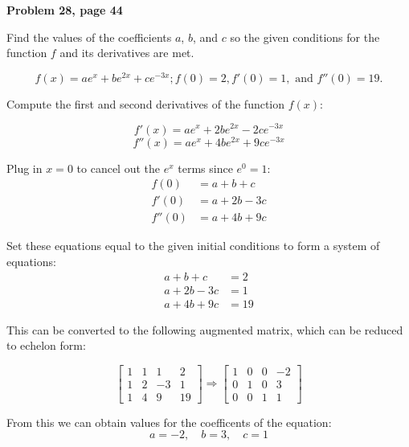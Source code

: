 \documentclass[12pt]{article}
\begin{document}
\pagebreak
\textbf{Problem 28, page 44}

Find the values of the coefficients $a$, $b$, and $c$ so the given conditions for the function $f$ and its derivatives are met.

$$f(x) = ae^{x} + be^{2x} + ce^{-3x}; f(0) = 2, f'(0) = 1,\text{ and } f''(0) = 19.$$


\begin{solution}

Compute the first and second derivatives of the function $f(x)$:

$$ f'(x) = ae^{x} + 2be^{2x} - 2ce^{-3x}$$
$$  f''(x) = ae^{x} + 4be^{2x} + 9ce^{-3x} $$

Plug in $x = 0$ to cancel out the $e^{x}$ terms since $e^{0} = 1$:
\begin{align*}
f(0) &= a + b + c \\ 
f'(0) &= a + 2b - 3c \\
f''(0) &= a + 4b + 9c 
\end{align*}

Set these equations equal to the given initial conditions to form a system of equations:
\begin{align*}
a + b + c &= 2 \\ 
a + 2b - 3c &= 1 \\
a + 4b + 9c &= 19
\end{align*}

This can be converted to the following augmented matrix, which can be reduced to echelon form:

$$ \begin{bmatrix} 1 & 1 & 1 & 2\\
					1 & 2 & -3 & 1\\
					1 & 4 & 9 & 19 \end{bmatrix} \Rightarrow 
\begin{bmatrix} 1 & 0 & 0 & -2\\
					0 & 1 & 0 & 3 \\
					0 & 0 & 1 & 1 \end{bmatrix}$$
					
From this we can obtain values for the coefficents of the equation:
$$a = -2, \quad b = 3, \quad c = 1 $$
\end{solution}
\end{document}
